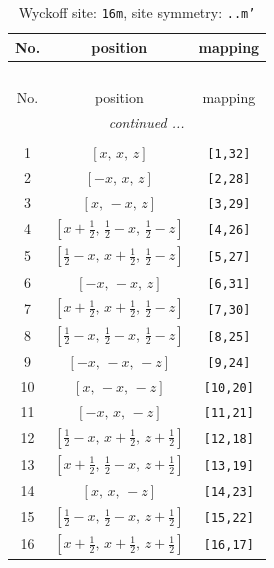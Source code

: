 \documentclass[fleqn,8pt]{jsarticle}
\begin{document}
\renewcommand{\arraystretch}{1.2}
\begin{longtable}{ccc}
\caption{Wyckoff site: {\tt 16m}, site symmetry: {\tt ..m'}}
 \\
 \hline \hline
No. & position & mapping \\ \hline \endfirsthead

\multicolumn{2}{l}{\tablename\ \thetable{}} \\
 \hline \hline
No. & position & mapping \\ \hline \endhead

 \hline \hline
\multicolumn{2}{r}{\footnotesize\it continued ...} \\ \endfoot

 \hline \hline
\multicolumn{2}{r}{} \\ \endlastfoot

1 & $\left[ x,\, x,\, z \right]$ & {\tt [1,32]} \\ \hline
2 & $\left[ - x,\, x,\, z \right]$ & {\tt [2,28]} \\ \hline
3 & $\left[ x,\, - x,\, z \right]$ & {\tt [3,29]} \\ \hline
4 & $\left[ x + \frac{1}{2},\, \frac{1}{2} - x,\, \frac{1}{2} - z \right]$ & {\tt [4,26]} \\ \hline
5 & $\left[ \frac{1}{2} - x,\, x + \frac{1}{2},\, \frac{1}{2} - z \right]$ & {\tt [5,27]} \\ \hline
6 & $\left[ - x,\, - x,\, z \right]$ & {\tt [6,31]} \\ \hline
7 & $\left[ x + \frac{1}{2},\, x + \frac{1}{2},\, \frac{1}{2} - z \right]$ & {\tt [7,30]} \\ \hline
8 & $\left[ \frac{1}{2} - x,\, \frac{1}{2} - x,\, \frac{1}{2} - z \right]$ & {\tt [8,25]} \\ \hline
9 & $\left[ - x,\, - x,\, - z \right]$ & {\tt [9,24]} \\ \hline
10 & $\left[ x,\, - x,\, - z \right]$ & {\tt [10,20]} \\ \hline
11 & $\left[ - x,\, x,\, - z \right]$ & {\tt [11,21]} \\ \hline
12 & $\left[ \frac{1}{2} - x,\, x + \frac{1}{2},\, z + \frac{1}{2} \right]$ & {\tt [12,18]} \\ \hline
13 & $\left[ x + \frac{1}{2},\, \frac{1}{2} - x,\, z + \frac{1}{2} \right]$ & {\tt [13,19]} \\ \hline
14 & $\left[ x,\, x,\, - z \right]$ & {\tt [14,23]} \\ \hline
15 & $\left[ \frac{1}{2} - x,\, \frac{1}{2} - x,\, z + \frac{1}{2} \right]$ & {\tt [15,22]} \\ \hline
16 & $\left[ x + \frac{1}{2},\, x + \frac{1}{2},\, z + \frac{1}{2} \right]$ & {\tt [16,17]} \\
\end{longtable}
\end{document}
